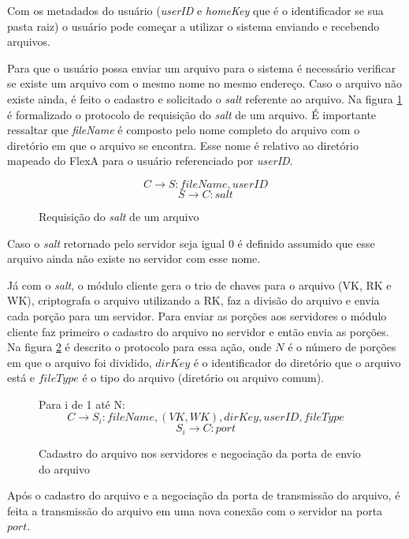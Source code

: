         Com os metadados do usuário (\textit{userID} e \textit{homeKey} que é o identificador se sua pasta raiz) o usuário pode começar a utilizar o sistema enviando e recebendo arquivos.
        
        Para que o usuário possa enviar um arquivo para o sistema é necessário verificar se existe um arquivo com o mesmo nome no mesmo endereço. Caso o arquivo não existe ainda, é feito o cadastro e solicitado o \textit{salt} referente ao arquivo. Na figura \ref{fig:proGetSalt} é formalizado o protocolo de requisição do \textit{salt} de um arquivo. É importante ressaltar que \textit{fileName} é composto pelo nome completo do arquivo com o diretório em que o arquivo se encontra. Esse nome é relativo ao diretório mapeado do FlexA para o usuário referenciado por \textit{userID}.

        \begin{figure}
        \[ C \rightarrow S: fileName,userID \]
        \[ S \rightarrow C: salt \]
        \caption{Requisição do \textit{salt} de um arquivo}
        \label{fig:proGetSalt}
        \end{figure}
        
        Caso o \textit{salt} retornado pelo servidor seja igual $0$ é definido assumido que esse arquivo ainda não existe no servidor com esse nome.
        
        Já com o \textit{salt}, o módulo cliente gera o trio de chaves para o arquivo (VK, RK e WK), criptografa o arquivo utilizando a RK, faz a divisão do arquivo e envia cada porção para um servidor. Para enviar as porções aos servidores o módulo cliente faz primeiro o cadastro do arquivo no servidor e então envia as porções. Na figura \ref{fig:proSendFile} é descrito o protocolo para essa ação, onde $N$ é o número de porções em que o arquivo foi dividido, $dirKey$ é o identificador do diretório que o arquivo está e $fileType$ é o tipo do arquivo (diretório ou arquivo comum).
        
        \begin{figure}
        
        Para i de 1 até N:
        \[ C \rightarrow S_{i}: fileName,(VK,WK),dirKey,userID,fileType \]
        \[ S_{i} \rightarrow C: port \]
        
        
        \caption{Cadastro do arquivo nos servidores e negociação da porta de envio do arquivo}
        \label{fig:proSendFile}
        \end{figure}
        
        Após o cadastro do arquivo e a negociação da porta de transmissão do arquivo, é feita a transmissão do arquivo em uma nova conexão com o servidor na porta $port$.
        
